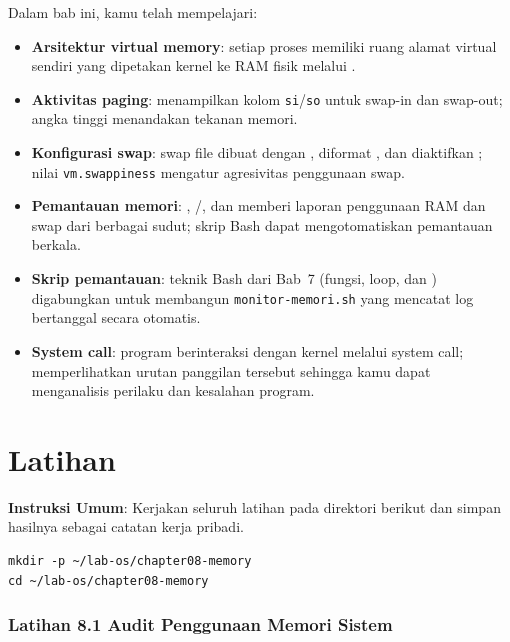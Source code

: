 Dalam bab ini, kamu telah mempelajari:

\begin{itemize}
    \item \textbf{Arsitektur virtual memory}: setiap proses memiliki ruang alamat virtual
          sendiri yang dipetakan kernel ke RAM fisik melalui .
    \item \textbf{Aktivitas paging}:  menampilkan kolom \texttt{si}/\texttt{so}
          untuk swap-in dan swap-out; angka tinggi menandakan tekanan memori.
    \item \textbf{Konfigurasi swap}: swap file dibuat dengan , diformat
          , dan diaktifkan ; nilai \texttt{vm.swappiness} mengatur
          agresivitas penggunaan swap.
    \item \textbf{Pemantauan memori}: , /, dan
           memberi laporan penggunaan RAM dan swap dari berbagai sudut;
          skrip Bash dapat mengotomatiskan pemantauan berkala.
    \item \textbf{Skrip pemantauan}: teknik Bash dari Bab~7 (fungsi, loop, dan
          ) digabungkan untuk membangun \texttt{monitor-memori.sh} yang
          mencatat log bertanggal secara otomatis.
    \item \textbf{System call}: program berinteraksi dengan kernel melalui system call;
           memperlihatkan urutan panggilan tersebut sehingga kamu dapat
          menganalisis perilaku dan kesalahan program.
\end{itemize}

\section{Latihan}

\textbf{Instruksi Umum}: Kerjakan seluruh latihan pada direktori berikut dan simpan hasilnya sebagai catatan kerja pribadi.

\begin{lstlisting}[caption={Persiapan direktori tugas}]
mkdir -p ~/lab-os/chapter08-memory
cd ~/lab-os/chapter08-memory
\end{lstlisting}

\subsubsection{Latihan 8.1 Audit Penggunaan Memori Sistem}

